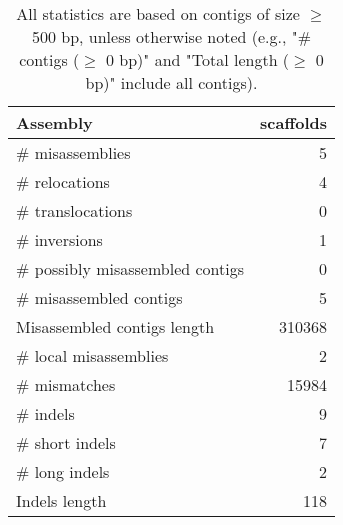 \documentclass[12pt,a4paper]{article}
\begin{document}
\begin{table}[ht]
\begin{center}
\caption{All statistics are based on contigs of size $\geq$ 500 bp, unless otherwise noted (e.g., "\# contigs ($\geq$ 0 bp)" and "Total length ($\geq$ 0 bp)" include all contigs).}
\begin{tabular}{|l*{1}{|r}|}
\hline
Assembly & scaffolds \\ \hline
\# misassemblies & 5 \\ \hline
\hspace{5mm}\# relocations & 4 \\ \hline
\hspace{5mm}\# translocations & 0 \\ \hline
\hspace{5mm}\# inversions & 1 \\ \hline
\# possibly misassembled contigs & 0 \\ \hline
\# misassembled contigs & 5 \\ \hline
Misassembled contigs length & 310368 \\ \hline
\# local misassemblies & 2 \\ \hline
\# mismatches & 15984 \\ \hline
\# indels & 9 \\ \hline
\hspace{5mm}\# short indels & 7 \\ \hline
\hspace{5mm}\# long indels & 2 \\ \hline
Indels length & 118 \\ \hline
\end{tabular}
\end{center}
\end{table}
\end{document}
